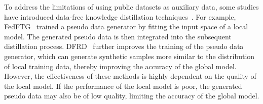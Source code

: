 To address the limitations of using public datasets as auxiliary data, some studies have introduced data-free knowledge distillation techniques~\cite{chen2019data, do2022momentum}. For example, FedFTG~\cite{zhang2022fine} trained a pseudo data generator by fitting the input space of a local model. The generated pseudo data is then integrated into the subsequent distillation process. DFRD~\cite{wang2024dfrd} further improves the training of the pseudo data generator, which can generate synthetic samples more similar to the distribution of local training data, thereby improving the accuracy of the global model. However, the effectiveness of these methods is highly dependent on the quality of the local model. If the performance of the local model is poor, the generated pseudo data may also be of low quality, limiting the accuracy of the global model.



